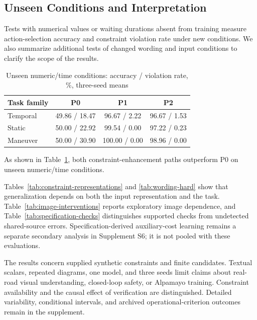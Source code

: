 \documentclass[nolineno]{ieeeaccess}
\renewcommand{\arraystretch}{1.12}\hypersetup{hidelinks}\raggedbottom
\begin{document}
\subsection{Unseen Conditions and Interpretation}

Tests with numerical values or waiting durations absent from training measure action-selection accuracy and constraint violation rate under new conditions. We also summarize additional tests of changed wording and input conditions to clarify the scope of the results.\par


\begin{table}[tbp]\caption{Unseen numeric/time conditions: accuracy / violation rate, \%, three-seed means}\label{tab:unseen-conditions}
\centering\fontsize{8}{10}\selectfont\setlength{\tabcolsep}{3pt}\renewcommand{\arraystretch}{1.05}
\begin{tabular}{@{}lccc@{}}
\toprule
\textbf{Task family} & \textbf{P0} & \textbf{P1} & \textbf{P2}\\
\midrule
Temporal & 49.86 / 18.47 & 96.67 / 2.22 & 96.67 / 1.53\\[1pt]
Static & 50.00 / 22.92 & 99.54 / 0.00 & 97.22 / 0.23\\[1pt]
Maneuver & 50.00 / 30.90 & 100.00 / 0.00 & 98.96 / 0.00\\[1pt]
\bottomrule\end{tabular}
\end{table}

As shown in Table~\ref{tab:unseen-conditions}, both constraint-enhancement paths outperform P0 on unseen numeric/time conditions.\par

Tables~\ref{tab:constraint-representations} and \ref{tab:wording-hard} show that generalization depends on both the input representation and the task. Table~\ref{tab:image-interventions} reports exploratory image dependence, and Table~\ref{tab:specification-checks} distinguishes supported checks from undetected shared-source errors. Specification-derived auxiliary-cost learning remains a separate secondary analysis in Supplement S6; it is not pooled with these evaluations.\par

The results concern supplied synthetic constraints and finite candidates. Textual scalars, repeated diagrams, one model, and three seeds limit claims about real-road visual understanding, closed-loop safety, or Alpamayo training. Constraint availability and the causal effect of verification are distinguished. Detailed variability, conditional intervals, and archived operational-criterion outcomes remain in the supplement.\par
\end{document}

